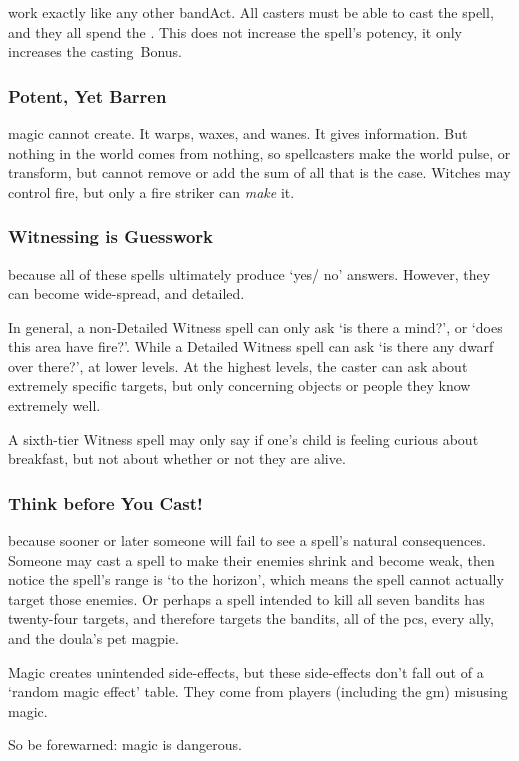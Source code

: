 \begin{multicols}{2}
\subsubsection{ }
work exactly like any other \gls{bandAct}.%
All casters must be able to cast the spell, and they all spend the .
This does not increase the spell's potency, it only increases the \gls{casting}~Bonus.

\subsubsection{Potent, Yet Barren}
magic cannot create.
It warps, waxes, and wanes.
It gives information.
But nothing in the world comes from nothing, so spellcasters make the world pulse, or transform, but cannot remove or add the sum of all that is the case.
Witches may control fire, but only a fire striker can \textit{make} it.

\subsubsection{Witnessing is Guesswork}
because all of these spells ultimately produce `yes/ no' answers.
However, they can become wide-spread, and detailed.

In general, a non-Detailed Witness spell can only ask `is there a mind?', or `does this \gls{area} have fire?'.
While a Detailed Witness spell can ask `is there any dwarf over there?', at lower levels.
At the highest levels, the caster can ask about extremely specific targets, but only concerning objects or people they know extremely well.

A sixth-tier Witness spell may only say if one's child is feeling curious about breakfast, but not about whether or not they are alive.

\subsubsection{Think before You Cast!}
because sooner or later someone will fail to see a spell's natural consequences.
Someone may cast a spell to make their enemies shrink and become weak, then notice the spell's range is `to the horizon', which means the spell cannot actually target those enemies.
Or perhaps a spell intended to kill all seven bandits has twenty-four targets, and therefore targets the bandits, all of the \glspl{pc}, every ally, and the \gls{doula}'s pet magpie.

Magic creates unintended side-effects, but these side-effects don't fall out of a `random magic effect' table.
They come from players (including the \gls{gm}) misusing magic.

So be forewarned: magic is dangerous.

\end{multicols}

